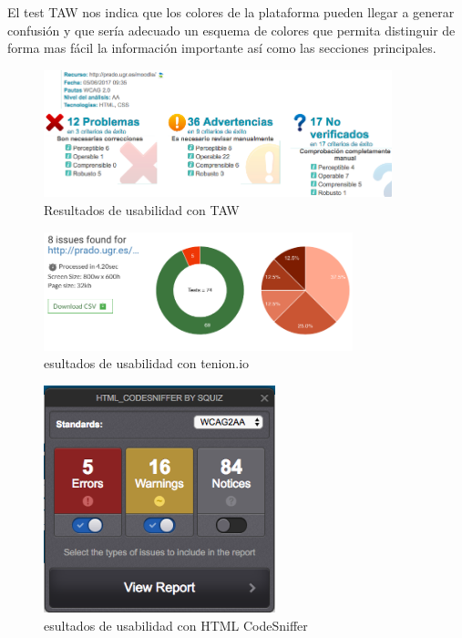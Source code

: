 \bigskip
El test TAW nos indica que los colores de la plataforma pueden llegar a generar confusión y que sería adecuado un esquema de colores que permita distinguir de forma mas fácil la información importante así como las secciones principales.

\begin{figure}[H]
\centering
\includegraphics[width=0.9\textwidth]{../screenshots/tawdis}
\caption{Resultados de usabilidad con TAW}
\label{fig:tawdis}
\end{figure}

\begin{figure}[H]
\centering
\includegraphics[width=0.8\textwidth]{../screenshots/tenon}
\caption{esultados de usabilidad con tenion.io}
\label{fig:tenon}
\end{figure}

\begin{figure}[H]
\centering
\includegraphics[width=0.6\textwidth]{../screenshots/htmlcodesniffer}
\caption{esultados de usabilidad con HTML CodeSniffer}
\label{fig:htmlcodesniffer}
\end{figure}


